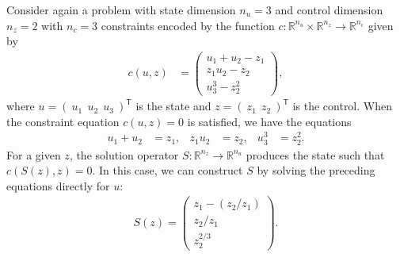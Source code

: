 \documentclass{article}
\def\R{{\mathbb R}}
\newcommand{\trp}{^{\mathsf{T}}}
\begin{document}
Consider again a problem with state dimension $n_{u} = 3$ and control dimension $n_{z} = 2$ with $n_{c}=3$ constraints encoded by the function $c : \R^{n_{u}}\times\R^{n_{z}}\to\R^{n_{c}}$ given by
\begin{align*}
    c(u, z)
    &= \left(\begin{array}{c}
        u_1 + u_2 - z_1 \\
        z_1u_2 - z_2 \\
        u_3^3 - z_2^2
    \end{array}\right),
\end{align*}
where $u = (~u_{1}~~u_{2}~~u_{3}~)\trp$ is the state and $z = (~z_{1}~~z_{2}~)\trp$ is the control.
When the constraint equation $c(u, z) = 0$ is satisfied, we have the equations
\begin{align*}
    u_1 + u_2 &= z_1,
    &
    z_1u_2 &= z_2,
    &
    u_3^3 &= z_2^2.
\end{align*}
For a given $z$, the solution operator $S:\R^{n_{z}}\to\R^{n_{u}}$ produces the state such that $c(S(z), z) = 0$.
In this case, we can construct $S$ by solving the preceding equations directly for $u$:
\begin{align*}
    S(z)
    = \left(\begin{array}{c}
        z_{1} -  (z_{2} / z_{1})\\
        z_{2} / z_{1} \\
        z_{2}^{2/3}
    \end{array}\right).
\end{align*}
\end{document}
